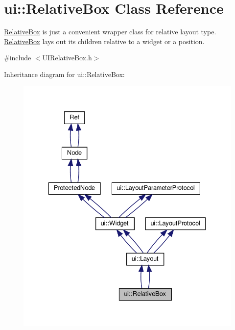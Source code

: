 \hypertarget{classui_1_1RelativeBox}{}\section{ui\+:\+:Relative\+Box Class Reference}
\label{classui_1_1RelativeBox}


\hyperlink{classui_1_1RelativeBox}{Relative\+Box} is just a convenient wrapper class for relative layout type. \hyperlink{classui_1_1RelativeBox}{Relative\+Box} lays out its children relative to a widget or a position.  




{\ttfamily \#include $<$U\+I\+Relative\+Box.\+h$>$}



Inheritance diagram for ui\+:\+:Relative\+Box\+:
\nopagebreak
\begin{figure}[H]
\begin{center}
\leavevmode
\includegraphics[width=329pt]{classui_1_1RelativeBox__inherit__graph}
\end{center}
\end{figure}


